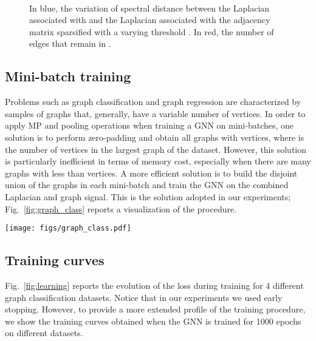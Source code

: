 \documentclass[journal]{IEEEtran}
\begin{document}
\begin{figure}
    \centering
    ~
    ~
    \caption{In blue, the variation of spectral distance between the Laplacian  associated with  and the Laplacian  associated with the adjacency matrix  sparsified with a varying threshold . In red, the number of edges that remain in .}
    \label{fig:varying_eps2}
\end{figure}
	

\subsection{Mini-batch training}
Problems such as graph classification and graph regression are characterized by samples of graphs that, generally, have a variable number of vertices.
In order to apply MP and pooling operations when training a GNN on mini-batches, one solution is to perform zero-padding and obtain all graphs with  vertices, where  is the number of vertices in the largest graph of the dataset.
However, this solution is particularly inefficient in terms of memory cost, especially when there are many graphs with less than  vertices.
A more efficient solution is to build the disjoint union of the graphs in each mini-batch and train the GNN on the combined Laplacian and graph signal.
This is the solution adopted in our experiments; Fig.~\ref{fig:graph_class} reports a visualization of the procedure.

\begin{figure*}[!ht]
    \centering
    \texttt{[image: figs/graph\_class.pdf]}    
    \caption{Example of the implementation used in the graph classification task, where the GNN is fed with a disjoint union of the graphs in mini-batch. The illustration shows an example for a mini-batch of size three.}
    \label{fig:graph_class}
\end{figure*}

\subsection{Training curves}
Fig.~\ref{fig:learning} reports the evolution of the loss during training for 4 different graph classification datasets.
Notice that in our experiments we used early stopping. 
However, to provide a more extended profile of the training procedure, we show the training curves obtained when the GNN is trained for 1000 epochs on different datasets.
\end{document}
